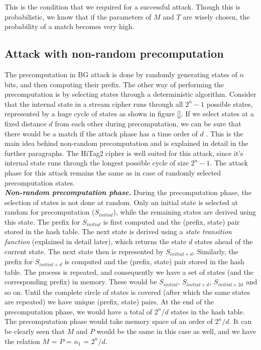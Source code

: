 This is the condition that we required for a successful attack. Though this is probabilistic, we know that if the parameters of $M$ and $T$ are wisely chosen, the probability of a match becomes very high.

\subsection{Attack with non-random precomputation}
\label{sec:bg-nr}

The precomputation in BG attack is done by randomly generating states of $n$ bits, and then computing their prefix. The other way of performing the precomputation is by selecting states through a deterministic algorithm. Consider that the internal state in a stream cipher runs through all $2^n - 1$ possible states, represented by a huge cycle of states as shown in figure \ref{}. If we select states at a fixed distance $d$ from each other during precomputation, we can be sure that there would be a match if the attack phase has a time order of $d$ \cite{erik-discussions}. This is the main idea behind non-random precomputation and is explained in detail in the further paragraphs. The HiTag2 cipher is well suited for this attack, since it's internal state runs through the longest possible cycle of size $2^n - 1$. The attack phase for this attack remains the same as in case of randomly selected precomputation states.\\

\textit{\textbf{Non-random precomputation phase.}} During the precomputation phase, the selection of states is not done at random. Only an initial state is selected at random for precomputation ($S_{initial}$), while the remaining states are derived using this state. The prefix for $S_{initial}$ is first computed and the (prefix, state) pair stored in the hash table. The next state is derived using a \emph{state transition function} (explained in detail later), which returns the state $d$ states ahead of the current state. The next state then is represented by $S_{initial+d}$. Similarly, the prefix for $S_{initial+d}$ is computed and the (prefix, state) pair stored in the hash table. The process is repeated, and consequently we have a set of states (and the corresponding prefix) in memory. These would be $S_{initial}$, $S_{initial+d}$, $S_{initial+2d}$ and so on. Until the complete circle of states is covered (after which the same states are repeated) we have unique (prefix, state) pairs. At the end of the precomputation phase, we would have a total of $2^n/d$ states in the hash table. The precomputation phase would take memory space of an order of $2^n/d$. It can be clearly seen that $M$ and $P$ would be the same in this case as well, and we have the relation $M$ = $P$ = $n_1$ = $2^n/d$.\\

